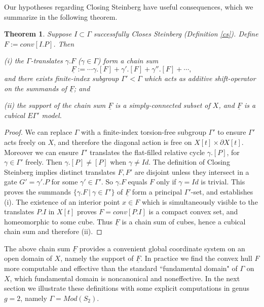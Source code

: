 \documentclass[12pt]{amsart}
\newtheorem{thm}{Theorem}
\theoremstyle{definition}
\theoremstyle{remark}
\newcommand{\del}{\partial}
\newcommand{\uF}{\underline{F}}
\begin{document}
Our hypotheses regarding Closing Steinberg have useful consequences, which we summarize in the following theorem.
\begin{thm}\label{cs1} 
Suppose $I \subset \Gamma$ successfully Closes Steinberg (Definition \ref{cs}). Define $F:=conv[I.P]$. Then

(i) the $\Gamma$-translates $\gamma.F$ ($\gamma \in \Gamma$) form a chain sum $$\uF:= \cdots \gamma.[F] + \gamma'.[F] + \gamma''.[F]+\cdots, $$ and there exists finite-index subgroup $\Gamma' <\Gamma$ which acts as additive shift-operator on the summands of $\uF$; and

(ii) the support of the chain sum $\uF$ is a simply-connected subset of $X$, and $\uF$ is a cubical $E\Gamma'$ model.

\end{thm}
\begin{proof}
We can replace $\Gamma$ with a finite-index torsion-free subgroup $\Gamma'$ to ensure $\Gamma'$ acts freely on $X$, and therefore the diagonal action is free on $X[t] \times \del X[t]$. Moreover we can ensure $\Gamma'$ translates the flat-filled relative cycle $\gamma.[P]$, for $\gamma\in \Gamma'$ freely. Then $\gamma.[P] \neq [P]$ when $\gamma\neq Id$. The definition of Closing Steinberg implies distinct translates $F, F'$ are disjoint unless they intersect in a gate $G'=\gamma'.P$ for some $\gamma' \in \Gamma'$. So $\gamma.F$ equals $F$ only if $\gamma=Id$ is trivial. This proves the summands $\{\gamma.F~|~ \gamma\in \Gamma'\}$ of $\uF$ form a principal $\Gamma'$-set, and establishes (i). The existence of an interior point $x\in F$ which is simultaneously visible to the translates $P.I$ in $X[t]$ proves $F=conv[P.I]$ is a compact convex set, and homeomorphic to some cube. Thus $\uF$ is a chain sum of cubes, hence a cubical chain sum and therefore (ii). 
\end{proof}

The above chain sum $\uF$ provides a convenient global coordinate system on an open domain of $X$, namely the support of $\uF$. In practice we find the convex hull $F$ more computable and effective than the standard ``fundamental domain" of $\Gamma$ on $X$, which fundamental domain is noncanonical and noneffective. In the next section we illustrate these definitions with some explicit computations in genus $g=2$, namely $\Gamma = Mod(S_2)$.

\end{document}
